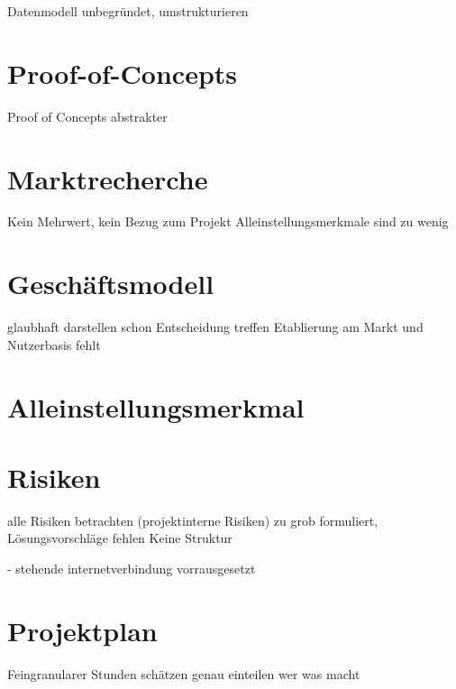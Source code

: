 \documentclass[12pt]{scrartcl}
\begin{document}
Datenmodell unbegründet, umstrukturieren


\section{Proof-of-Concepts}

Proof of Concepts abstrakter


\section{Marktrecherche}

Kein Mehrwert, kein Bezug zum Projekt
Alleinstellungsmerkmale sind zu wenig


\section{Geschäftsmodell}

glaubhaft darstellen
schon Entscheidung treffen
Etablierung am Markt und Nutzerbasis fehlt


\section{Alleinstellungsmerkmal}


\section{Risiken}

alle Risiken betrachten (projektinterne Risiken)
zu grob formuliert, Lösungsvorschläge fehlen
Keine Struktur

- stehende internetverbindung vorrausgesetzt


\section{Projektplan}

Feingranularer
Stunden schätzen
genau einteilen wer was macht

\end{document}
